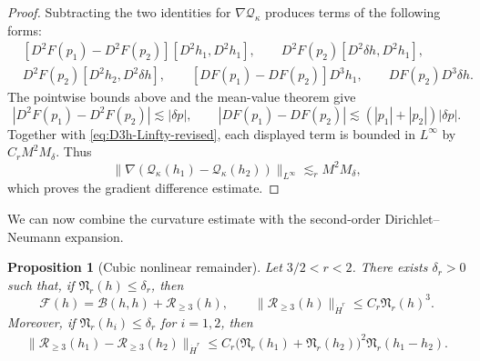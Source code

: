 \documentclass[12pt]{amsart}
\newtheorem{proposition}[theorem]{Proposition}
\theoremstyle{remark}
\theoremstyle{definition}
\numberwithin{equation}{section}
\begin{document}
\begin{proof}
Subtracting the two identities for
\(\nabla\mathcal Q_\kappa\) produces terms of the following forms:
\begin{align*}
 &[D^2F(p_1)-D^2F(p_2)][D^2h_1,D^2h_1],\qquad D^2F(p_2)[D^2\delta h,D^2h_1], \\
 &D^2F(p_2)[D^2h_2,D^2\delta h],\qquad [DF(p_1)-DF(p_2)]D^3h_1, \qquad DF(p_2)D^3\delta h.
\end{align*}
The pointwise bounds above and the mean-value theorem give
\[
 |D^2F(p_1)-D^2F(p_2)|\lesssim|\delta p|,
 \qquad
 |DF(p_1)-DF(p_2)|\lesssim(|p_1|+|p_2|)|\delta p|.
\]
Together with \eqref{eq:D3h-Linfty-revised}, each displayed term is
bounded in \(L^\infty\) by \(C_rM^2M_\delta\).  Thus
\[
 \|\nabla(\mathcal Q_\kappa(h_1)-\mathcal Q_\kappa(h_2))\|_{L^\infty} \lesssim_r M^2M_\delta,
\]
which proves the gradient difference estimate.
\end{proof}

We can now combine the curvature estimate with the second-order
Dirichlet--Neumann expansion.

\begin{proposition}[Cubic nonlinear remainder] \label{prop:capillary-remainder-revised}
Let \(3/2<r<2\).
There exists \(\delta_r>0\) such that, if
\(\mathfrak N_r(h)\leq\delta_r\), then
\begin{equation*}
 \mathscr F(h) = \mathcal B(h,h)+\mathscr R_{\geq3}(h), \qquad
 \|\mathscr R_{\geq3}(h)\|_{\dot H^r} \leq C_r\mathfrak N_r(h)^3.
\end{equation*}
Moreover, if \(\mathfrak N_r(h_i)\leq\delta_r\) for \(i=1,2\), then
\begin{equation*}
\begin{aligned}
 \|\mathscr R_{\geq3}(h_1)-\mathscr R_{\geq3}(h_2)\|_{\dot H^r}\leq C_r \bigl( \mathfrak N_r(h_1)+\mathfrak N_r(h_2) \bigr)^2 \mathfrak N_r(h_1-h_2).
\end{aligned}
\end{equation*}
\end{proposition}
\end{document}
